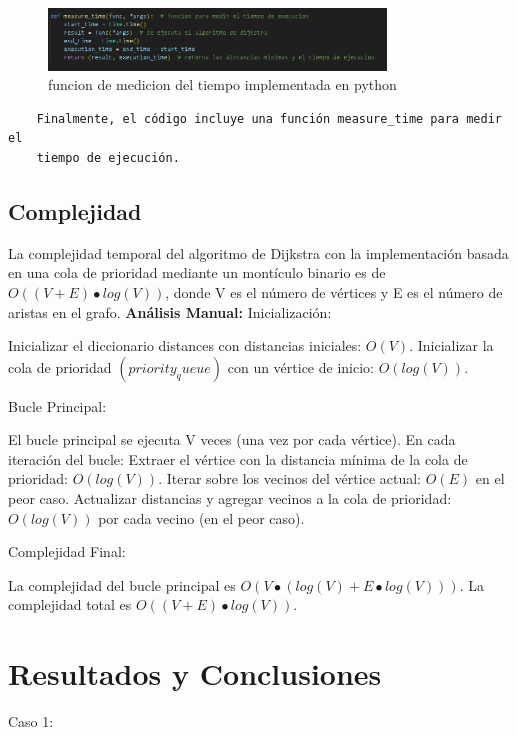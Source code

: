 \documentclass{article}
\begin{document}
\begin{figure}[H]
    \centering
    \includegraphics[width=0.8\textwidth]{figura_3_medicion_tiempo.PNG}
    \caption{funcion de medicion del tiempo implementada en python}
    \label{figura 3}
\end{figure}
\begin{verbatim}
    Finalmente, el código incluye una función measure_time para medir el 
    tiempo de ejecución.
\end{verbatim}
\subsection{Complejidad}
La complejidad temporal del algoritmo de Dijkstra con la implementación 
basada en una cola de prioridad mediante un montículo binario es de 
$O((V + E) \bullet log(V))$, donde V es el número de vértices y E es el número 
de aristas en el grafo.
\textbf{Análisis Manual:}
Inicialización:

Inicializar el diccionario distances con distancias iniciales: $O(V)$.
Inicializar la cola de prioridad $(priority_queue)$ con un vértice de inicio: 
$O(log(V))$.

Bucle Principal:

El bucle principal se ejecuta V veces (una vez por cada vértice).
En cada iteración del bucle:
Extraer el vértice con la distancia mínima de la cola de prioridad: $O(log(V))$.
Iterar sobre los vecinos del vértice actual: $O(E)$ en el peor caso.
Actualizar distancias y agregar vecinos a la cola de prioridad: $O(log(V))$ por 
cada vecino (en el peor caso).

Complejidad Final:

La complejidad del bucle principal es $O(V \bullet (log(V) + E \bullet log(V)))$.
La complejidad total es $O((V + E) \bullet log(V))$.
\section{Resultados y Conclusiones}
Caso 1:
\end{document}
